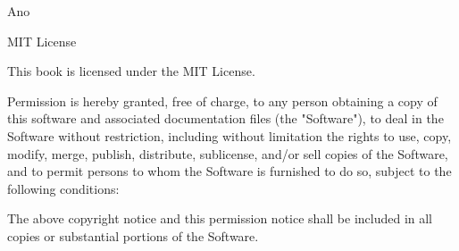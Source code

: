 \vfill

{\small
    Ano \editionyear

    MIT License

    \vspace{1cm}


    This book is licensed under the MIT License. 

    \vspace{1cm}

    Permission is hereby granted, free of charge, to any person obtaining a copy of this software and associated documentation files (the "Software"), to deal in the Software without restriction, including without limitation the rights to use, copy, modify, merge, publish, distribute, sublicense, and/or sell copies of the Software, and to permit persons to whom the Software is furnished to do so, subject to the following conditions:

    \vspace{1cm}

    The above copyright notice and this permission notice shall be included in all copies or substantial portions of the Software.

}
